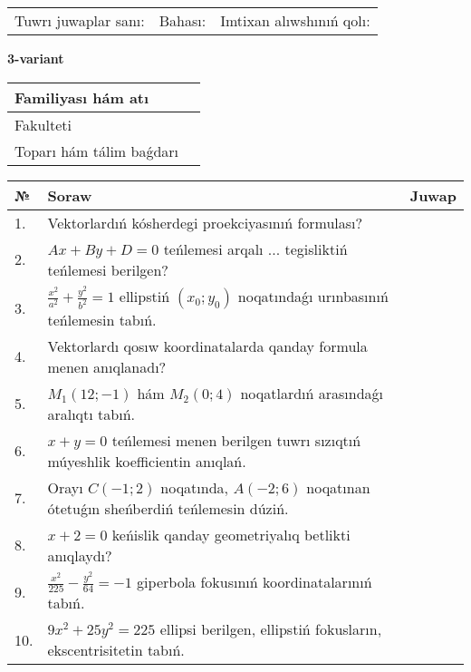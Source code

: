 \documentclass{article}
\begin{document}
\vspace{1cm}

\begin{tabular}{lll}
Tuwrı juwaplar sanı: \underline{\hspace{1.5cm}} & 
Bahası: \underline{\hspace{1.5cm}} & 
Imtixan alıwshınıń qolı: \underline{\hspace{2cm}} \\
\end{tabular}

\egroup

\newpage


\textbf{3-variant}\\

\bgroup
\def\arraystretch{1.6} %

\begin{tabular}{|m{5.7cm}|m{9.5cm}|}
\hline
Familiyası hám atı & \\
\hline
Fakulteti  & \\
\hline
Toparı hám tálim baǵdarı  & \\
\hline
\end{tabular}

\vspace{1cm}

\begin{tabular}{|m{0.7cm}|m{10cm}|m{4cm}|}
\hline
№ & Soraw & Juwap \\
\hline
1. & Vektorlardıń kósherdegi proekciyasınıń formulası? &  \\
\hline
2. & $Ax+By+D=0$ teńlemesi arqalı ... tegisliktiń teńlemesi berilgen? &  \\
\hline
3. & $\frac{x^2}{a^2}+\frac{y^2}{b^2}=1$ ellipstiń $(x_0;y_0)$ noqatındaǵı urınbasınıń teńlemesin tabıń. &  \\
\hline
4. & Vektorlardı qosıw koordinatalarda qanday formula menen anıqlanadı? &  \\
\hline
5. & $M_{1} (12;-1)$ hám $M_{2} (0;4)$ noqatlardıń arasındaǵı aralıqtı tabıń. &  \\
\hline
6. & $x+y=0$ teńlemesi menen berilgen tuwrı sızıqtıń múyeshlik koefficientin anıqlań. &  \\
\hline
7. & Orayı $C (-1;2)$ noqatında, $A (-2;6 )$ noqatınan ótetuǵın sheńberdiń teńlemesin dúziń. &  \\
\hline
8. & $x+2=0$ keńislik qanday geometriyalıq betlikti anıqlaydı? &  \\
\hline
9. & $\frac{x^{2}}{225}-\frac{y^{2}}{64}=-1$ giperbola fokusınıń koordinatalarınıń tabıń. &  \\
\hline
10. & $9x^{2}+25y^{2}=225$ ellipsi berilgen, ellipstiń fokusların, ekscentrisitetin tabıń. &  \\
\hline
\end{tabular}
\end{document}
